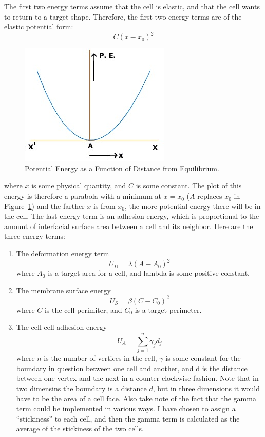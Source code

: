 The first two energy terms assume that the cell is elastic, and that the cell wants to return to a target shape. Therefore, the first two energy terms are of the elastic potential form: 
\begin{equation}
C(x-x_0)^2
\end{equation}
\begin{figure}
\centering
\includegraphics{../diagrams/pe.jpg}
\caption{Potential Energy as a Function of Distance from Equilibrium.}
\label{fig:pe}
\end{figure}
where $x$ is some physical quantity, and $C$ is some constant. The plot of this energy is therefore a parabola with a minimum at $x =  x_0$ ($A$ replaces $x_0$ in Figure~\ref{fig:pe}) and the farther $x$ is from $x_0$, the more potential energy there will be in the cell. 
The last energy term is an adhesion energy, which is proportional to the amount of interfacial surface area between a cell and its neighbor. Here are the three energy terms:
\begin{enumerate}
\item The deformation energy term \\ 
\begin{equation}
U_D = \lambda(A - A_0)^2
\end{equation}
 where $A_0$ is a target area for a cell, and lambda is some positive constant.
\item The membrane surface energy 
\begin{equation}
U_S = \beta(C - C_0)^2
\end{equation}
 where $C$ is the cell perimiter, and $C_0$ is a target perimeter.
\item The cell-cell adhesion energy 
\begin{equation}U_A = \displaystyle\sum\limits_{j = 1}^{n}\gamma_{j}d_{j}\end{equation}
where $n$ is the number of vertices in the cell, $\gamma$ is some constant for the boundary in question between one cell and another, and d is the distance between one vertex and the next in a counter clockwise fashion. Note that in two dimensins the boundary is a distance $d$, but in three dimensions it would have to be the area of a cell face. Also take note of the fact that the gamma term could be implemented in various ways. I have chosen to assign a ``stickiness'' to each cell, and then the gamma term is calculated as the average of the stickiness of the two cells.
\end{enumerate}

